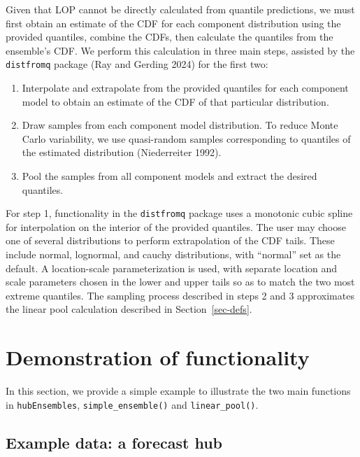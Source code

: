 \documentclass[
]{article}
\providecommand{\tightlist}{%
  \setlength{\itemsep}{0pt}\setlength{\parskip}{0pt}}\usepackage{longtable,booktabs,array}
\begin{document}
Given that LOP cannot be directly calculated from quantile predictions,
we must first obtain an estimate of the CDF for each component
distribution using the provided quantiles, combine the CDFs, then
calculate the quantiles from the ensemble's CDF. We perform this
calculation in three main steps, assisted by the \texttt{distfromq}
package (Ray and Gerding 2024) for the first two:

\begin{enumerate}
\def\labelenumi{\arabic{enumi}.}
\tightlist
\item
  Interpolate and extrapolate from the provided quantiles for each
  component model to obtain an estimate of the CDF of that particular
  distribution.
\item
  Draw samples from each component model distribution. To reduce Monte
  Carlo variability, we use quasi-random samples corresponding to
  quantiles of the estimated distribution (Niederreiter 1992).
\item
  Pool the samples from all component models and extract the desired
  quantiles.
\end{enumerate}

For step 1, functionality in the \texttt{distfromq} package uses a
monotonic cubic spline for interpolation on the interior of the provided
quantiles. The user may choose one of several distributions to perform
extrapolation of the CDF tails. These include normal, lognormal, and
cauchy distributions, with ``normal'' set as the default. A
location-scale parameterization is used, with separate location and
scale parameters chosen in the lower and upper tails so as to match the
two most extreme quantiles. The sampling process described in steps 2
and 3 approximates the linear pool calculation described in
Section~\ref{sec-defs}.

\section{Demonstration of functionality}\label{sec-simple-ex}

In this section, we provide a simple example to illustrate the two main
functions in \texttt{hubEnsembles}, \texttt{simple\_ensemble()} and
\texttt{linear\_pool()}.

\subsection{Example data: a forecast
hub}\label{example-data-a-forecast-hub}
\end{document}
